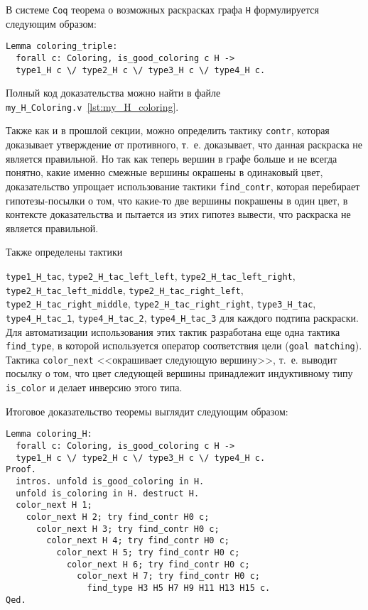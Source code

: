 В системе {\tt Coq} теорема о возможных раскрасках графа {\tt H} формулируется следующим образом:

\begin{verbatim}
Lemma coloring_triple:
  forall c: Coloring, is_good_coloring c H ->
  type1_H c \/ type2_H c \/ type3_H c \/ type4_H c.
\end{verbatim}

Полный код доказательства можно найти в файле {\tt my\_H\_Coloring.v}~\ref{lst:my_H_coloring}.

Также как и в прошлой секции, можно определить тактику {\tt contr}, которая доказывает утверждение от противного, т.~е. доказывает, что данная раскраска не является правильной. Но так как теперь вершин в графе больше и не всегда понятно, какие именно смежные вершины окрашены в одинаковый цвет, доказательство упрощает использование тактики {\tt find\_contr}, которая перебирает гипотезы-посылки о том, что какие-то две вершины покрашены в один цвет, в контексте доказательства и пытается из этих гипотез вывести, что раскраска не является правильной. 

Также определены тактики 

{\tt type1\_H\_tac}, {\tt type2\_H\_tac\_left\_left}, {\tt type2\_H\_tac\_left\_right}, {\tt type2\_H\_tac\_left\_middle}, {\tt type2\_H\_tac\_right\_left}, {\tt type2\_H\_tac\_right\_middle}, {\tt type2\_H\_tac\_right\_right}, {\tt type3\_H\_tac}, {\tt type4\_H\_tac\_1}, {\tt type4\_H\_tac\_2}, {\tt type4\_H\_tac\_3} для каждого подтипа раскраски. Для автоматизации использования этих тактик разработана еще одна тактика {\tt find\_type}, в которой используется оператор соответствия цели ({\tt goal matching}). Тактика {\tt color\_next} <<окрашивает следующую вершину>>, т.~е. выводит посылку о том, что цвет следующей вершины принадлежит индуктивному типу {\tt is\_color} и делает инверсию этого типа.

Итоговое доказательство теоремы выглядит следующим образом:

\begin{verbatim}
Lemma coloring_H:
  forall c: Coloring, is_good_coloring c H ->
  type1_H c \/ type2_H c \/ type3_H c \/ type4_H c.
Proof.
  intros. unfold is_good_coloring in H. 
  unfold is_coloring in H. destruct H.
  color_next H 1;
    color_next H 2; try find_contr H0 c;
      color_next H 3; try find_contr H0 c;
        color_next H 4; try find_contr H0 c;
          color_next H 5; try find_contr H0 c;
            color_next H 6; try find_contr H0 c;
              color_next H 7; try find_contr H0 c;
                find_type H3 H5 H7 H9 H11 H13 H15 c.
Qed.
\end{verbatim}


